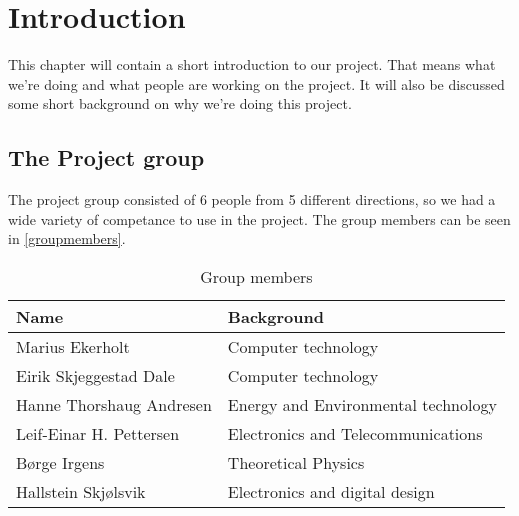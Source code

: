 \chapter{Introduction}
\label{chap:introduction}
This chapter will contain a short introduction to our project. That means what we're doing and what people are working on the project. It will also be discussed some short background on why we're doing this project.
\section{The Project group}
The project group consisted of 6 people from 5 different directions, so we had a wide variety of competance to use in the project. The group members can be seen in \autoref{groupmembers}.
\begin{table}
	\begin{center}
		\begin{tabular}{|p{4cm}|p{7cm}|}   
			\hline      
			\bf{Name} & \bf{Background} \\ 
			\hline
			Marius Ekerholt & Computer technology\\     
			\hline
			Eirik Skjeggestad Dale & Computer technology\\     
			\hline
			Hanne Thorshaug Andresen & Energy and Environmental technology\\     
			\hline
			Leif-Einar H. Pettersen & Electronics and Telecommunications\\     
			\hline
			Børge Irgens & Theoretical Physics\\     
			\hline
			Hallstein Skjølsvik & Electronics and digital design\\     
			\hline
		 \end{tabular}
	\end{center}
	\caption{Group members}
	\label{tab:groupmembers}
\end{table}